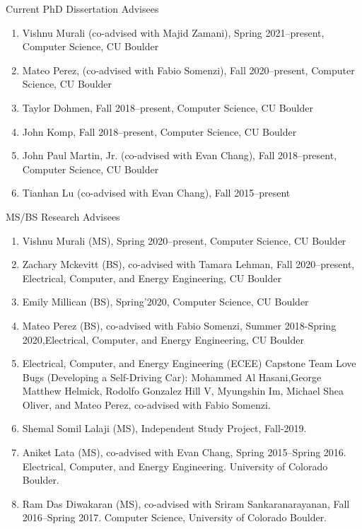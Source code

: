 \documentclass{article}
\begin{document}
\noindent Current PhD Dissertation Advisees
\begin{enumerate}
  \item Vishnu Murali (co-advised with Majid Zamani), Spring 2021--present, Computer Science, CU Boulder
  \item Mateo Perez, (co-advised with Fabio Somenzi), Fall 2020--present,
  Computer Science, CU Boulder 
  \item 
  Taylor Dohmen, Fall 2018–present, Computer Science, CU Boulder
  \item   
  John Komp, Fall 2018--present, Computer Science, CU Boulder
  \item 
  John Paul Martin, Jr. (co-advised with Evan Chang), Fall 2018--present,
  Computer Science, CU Boulder
  \item 
  Tianhan Lu (co-advised with Evan Chang), Fall 2015--present 
\end{enumerate}

\noindent MS/BS Research Advisees
\begin{enumerate}
  \item Vishnu Murali (MS), Spring 2020--present, Computer Science, CU Boulder
  \item Zachary Mckevitt (BS), co-advised with Tamara Lehman, Fall 2020--present,
  Electrical, Computer, and Energy Engineering, CU Boulder 
  \item Emily Millican (BS), Spring’2020, Computer Science, CU Boulder 
  \item Mateo Perez (BS), co-advised with Fabio Somenzi, Summer 2018-Spring
  2020,Electrical, Computer, and Energy Engineering, CU Boulder
  \item Electrical, Computer, and Energy Engineering (ECEE) Capstone Team Love Bugs (Developing a Self-Driving Car):
  Mohammed Al Hasani,George Matthew Helmick, Rodolfo Gonzalez Hill V, Myungshin
  Im, Michael Shea Oliver, and Mateo Perez, co-advised with Fabio Somenzi.
  \item Shemal Somil Lalaji (MS), Independent Study Project, Fall-2019.
  \item Aniket Lata (MS), co-advised with Evan Chang, Spring 2015--Spring
  2016. Electrical, Computer, and Energy Engineering. University of Colorado
  Boulder.
  \item Ram Das Diwakaran (MS), co-advised with Sriram Sankaranarayanan, Fall
  2016--Spring 2017. 
  Computer Science, University of Colorado  Boulder. 
\end{enumerate}
\end{document}
